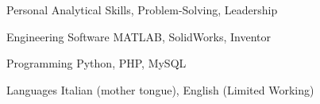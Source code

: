 

\begin{cvskills}

  \cvskill
  {Personal} %
  {Analytical Skills, Problem-Solving, Leadership} %

  \cvskill
  {Engineering Software} %
  {MATLAB, SolidWorks, Inventor} %

  \cvskill
  {Programming} %
  {Python, PHP, MySQL} %

  \cvskill
  {Languages} %
  {Italian (mother tongue), English (Limited Working)} %

\end{cvskills}
